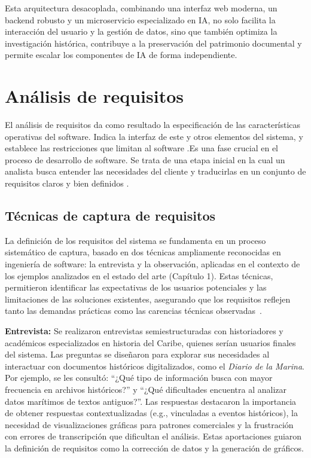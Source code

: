 Esta arquitectura desacoplada, combinando una interfaz web moderna, un backend robusto y un microservicio especializado en IA, no solo facilita la interacción del usuario y la gestión de datos, sino que también optimiza la investigación histórica, contribuye a la preservación del patrimonio documental y permite escalar los componentes de IA de forma independiente.


\section{Análisis de requisitos}

El análisis de requisitos da como resultado la especificación de las características operativas del software. Indica la interfaz de este y otros elementos del sistema, y establece las restricciones que limitan al software \cite{pressman2010practitioner}.Es una fase crucial en el proceso de desarrollo de software. Se trata de una etapa inicial en la cual un analista busca entender las necesidades del cliente y traducirlas en un conjunto de requisitos claros y bien definidos \cite{palli2023analisis}.

\subsection{Técnicas de captura de requisitos}


La definición de los requisitos del sistema se fundamenta en un proceso sistemático de captura, basado en dos técnicas ampliamente reconocidas en ingeniería de software: la entrevista y la observación, aplicadas en el contexto de los ejemplos analizados en el estado del arte (Capítulo 1). Estas técnicas, permitieron identificar las expectativas de los usuarios potenciales y las limitaciones de las soluciones existentes, asegurando que los requisitos reflejen tanto las demandas prácticas como las carencias técnicas observadas~\cite{sommerville2011software}.

\textbf{Entrevista:} Se realizaron entrevistas semiestructuradas con historiadores y académicos especializados en historia del Caribe, quienes serían usuarios finales del sistema. Las preguntas se diseñaron para explorar sus necesidades al interactuar con documentos históricos digitalizados, como el \textit{Diario de la Marina}. Por ejemplo, se les consultó: ``¿Qué tipo de información busca con mayor frecuencia en archivos históricos?'' y ``¿Qué dificultades encuentra al analizar datos marítimos de textos antiguos?''. Las respuestas destacaron la importancia de obtener respuestas contextualizadas (e.g., vinculadas a eventos históricos), la necesidad de visualizaciones gráficas para patrones comerciales y la frustración con errores de transcripción que dificultan el análisis. Estas aportaciones guiaron la definición de requisitos como la corrección de datos y la generación de gráficos.

